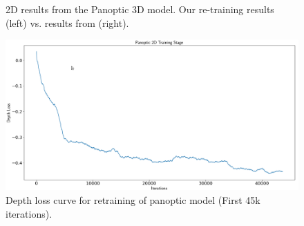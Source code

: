 \begin{figure}
\begin{minipage}{0.49\linewidth}
  \caption{2D results from the Panoptic 3D model. Our re-training results (left) vs. results from \citet{dahnert2021panoptic} (right).}
  \label{fig:qual_panoptic}
  \end{minipage}
  \hfill
  \begin{minipage}{0.49\linewidth}
    \centering
    \includegraphics[width=\linewidth]{figs/depthloss.png}
    \caption{Depth loss curve for retraining of panoptic model (First 45k iterations).}
    \label{subfig:additional}
    \vspace*{-3mm} %
  \end{minipage}
\end{figure}


